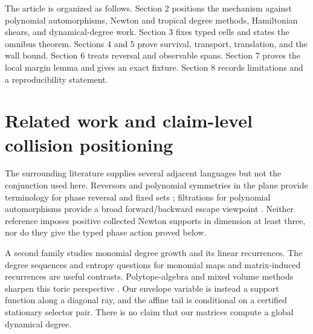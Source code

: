 \documentclass[11pt]{article}
\theoremstyle{definition}
\theoremstyle{remark}
\begin{document}
The article is organized as follows.  Section 2 positions the mechanism
against polynomial automorphisms, Newton and tropical degree methods,
Hamiltonian shears, and dynamical-degree work.  Section 3 fixes typed cells
and states the omnibus theorem.  Sections 4 and 5 prove survival, transport,
translation, and the wall bound.  Section 6 treats reversal and observable
spans.  Section 7 proves the local margin lemma and gives an exact fixture.
Section 8 records limitations and a reproducibility statement.

\begin{center}
\end{center}

\section{Related work and claim-level collision positioning}

The surrounding literature supplies several adjacent languages but not the
conjunction used here.  Reversors and polynomial symmetries in the plane
provide terminology for phase reversal and fixed sets
\cite{gomez_meiss_2004}; filtrations for polynomial automorphisms provide a
broad forward/backward escape viewpoint \cite{shafikov_wolf_2003}.  Neither
reference imposes positive collected Newton supports in dimension at least
three, nor do they give the typed phase action proved below.

A second family studies monomial degree growth and its linear recurrences.
The degree sequences and entropy questions for monomial maps
\cite{hasselblatt_propp_2007} and matrix-induced recurrences
\cite{bedford_kim_2008} are useful contrasts.  Polytope-algebra and mixed
volume methods sharpen this toric perspective
\cite{favre_wulcan_2012}.  Our envelope variable is instead a support
function along a diagonal ray, and the affine tail is conditional on a
certified stationary selector pair.  There is no claim that our matrices
compute a global dynamical degree.
\end{document}
